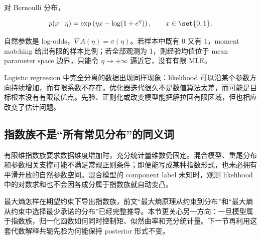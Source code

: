 对 Bernoulli 分布，

\[
p(x\mid\eta)
=\exp\left(
\eta x-\log(1+e^\eta)
\right),
\qquad x\in\set{0,1},
\]

自然参数是 log-odds，\(\nabla A(\eta)=\sigma(\eta)\)。若样本中既有 0 又有 1，moment matching 给出有限的样本比例；若全部观测为 1，则经验均值位于 mean parameter space 边界，只能令 \(\eta\to+\infty\) 逼近它，没有有限 MLE。

Logistic regression 中完全分离的数据出现同样现象：likelihood 可以沿某个参数方向持续增加，而有限系数不存在。优化器迭代很久不是数值算法太差，而可能是目标根本没有有限最优点。先验、正则化或改变模型能把解拉回有限区域，但也相应改变了估计问题。

\subsection{指数族不是“所有常见分布”的同义词}

有限维指数族要求数据维度增加时，充分统计量维数仍固定。混合模型、重尾分布和参数相关支撑可能不满足常规正则条件；即便能写成某种指数形式，也未必拥有平滑开放的自然参数空间。混合模型的 component label 未知时，观测 likelihood 中的对数求和也不会因各成分属于指数族就自动变凸。

最大熵怎样在期望约束下导出指数族，前文“最大熵原理从约束到分布”和“最大熵从约束中选择最少承诺的分布”已经完整推导。本节更关心另一方向：一旦模型属于指数族，归一化函数如何同时控制矩、似然曲率和充分统计量。下一节再利用这套代数解释共轭先验为何能保持 posterior 形式不变。

